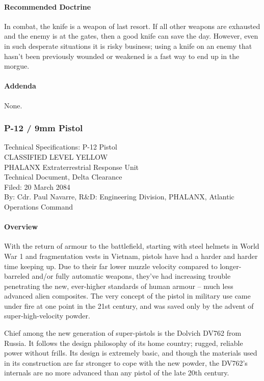 \paragraph*{Recommended Doctrine}
In combat, the knife is a weapon of last resort. If all other weapons are exhausted and the enemy is at the gates, then a good knife can save the day. However, even in such desperate situations it is risky business; using a knife on an enemy that hasn't been previously wounded or weakened is a fast way to end up in the morgue.
\paragraph*{Addenda}
None.
\subsubsection*{P-12 / 9mm Pistol}
Technical Specifications: P-12 Pistol\\
CLASSIFIED LEVEL YELLOW\\
PHALANX Extraterrestrial Response Unit\\
Technical Document, Delta Clearance\\
Filed: 20 March 2084\\
By: Cdr. Paul Navarre, R&D: Engineering Division, PHALANX, Atlantic Operations Command\\
\paragraph*{Overview}
With the return of armour to the battlefield, starting with steel helmets in World War 1 and fragmentation vests in Vietnam, pistols have had a harder and harder time keeping up. Due to their far lower muzzle velocity compared to longer-barreled and/or fully automatic weapons, they've had increasing trouble penetrating the new, ever-higher standards of human armour -- much less advanced alien composites. The very concept of the pistol in military use came under fire at one point in the 21st century, and was saved only by the advent of super-high-velocity powder.

Chief among the new generation of super-pistols is the Dolvich DV762 from Russia. It follows the design philosophy of its home country; rugged, reliable power without frills. Its design is extremely basic, and though the materials used in its construction are far stronger to cope with the new powder, the DV762's internals are no more advanced than any pistol of the late 20th century.

